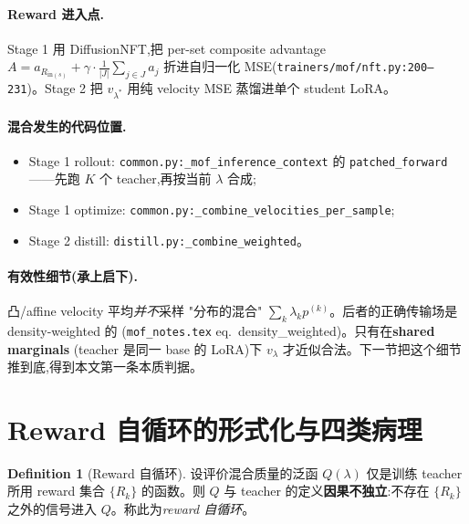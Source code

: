 \documentclass[11pt,a4paper]{article}
\theoremstyle{definition}
\newtheorem{definition}{Definition}
\begin{document}
\paragraph{Reward 进入点.} Stage 1 用 DiffusionNFT,把 per-set composite
advantage $A=a_{R_{\text{in}(s)}}+\gamma\cdot\frac{1}{|J|}\sum_{j\in J}a_j$
折进自归一化 MSE(\texttt{trainers/mof/nft.py:200--231})。Stage 2 把
$v_{\lambda^*}$ 用纯 velocity MSE 蒸馏进单个 student LoRA。

\paragraph{混合发生的代码位置.}
\begin{itemize}[leftmargin=1.5em]
\item Stage 1 rollout: \texttt{common.py:\_mof\_inference\_context} 的
\texttt{patched\_forward}——先跑 $K$ 个 teacher,再按当前 $\lambda$ 合成;
\item Stage 1 optimize: \texttt{common.py:\_combine\_velocities\_per\_sample};
\item Stage 2 distill: \texttt{distill.py:\_combine\_weighted}。
\end{itemize}

\paragraph{有效性细节(承上启下).} 凸/affine velocity 平均\emph{并不}采样
"分布的混合" $\sum_k\lambda_k p^{(k)}$。后者的正确传输场是 density-weighted 的
(\texttt{mof\_notes.tex} eq.~density\_weighted)。只有在\textbf{shared marginals}
(teacher 是同一 base 的 LoRA)下 $v_\lambda$ 才近似合法。下一节把这个细节
推到底,得到本文第一条本质判据。

\section{Reward 自循环的形式化与四类病理}
\label{sec:pathology}

\begin{definition}[Reward 自循环]
\label{def:selfloop}
设评价混合质量的泛函 $Q(\lambda)$ 仅是训练 teacher 所用 reward 集合
$\{R_k\}$ 的函数。则 $Q$ 与 teacher 的定义\textbf{因果不独立}:不存在
$\{R_k\}$ 之外的信号进入 $Q$。称此为\emph{reward 自循环}。
\end{definition}
\end{document}
